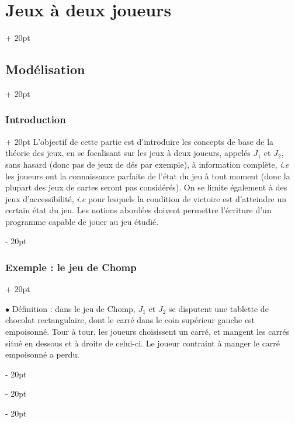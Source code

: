 \documentclass[a4paper, 12pt, twoside]{article}
\newcommand{\ind}[1][20pt]{\advance\leftskip + #1}
\newcommand{\deind}[1][20pt]{\advance\leftskip - #1}
\newenvironment{indt}[2][20pt]{#2 \par \ind[#1]}{\par \deind} %
\begin{document}
    \vspace{12pt}
    
    \begin{indt}{\section{Jeux à deux joueurs}}
        \begin{indt}{\subsection{Modélisation}}
            \begin{indt}{\subsubsection{Introduction}}
                L'objectif de cette partie est d'introduire les concepts de base de la théorie des jeux, en se focalisant sur les jeux à deux joueurs, appelés $J_1$ et $J_2$, sans hasard (donc pas de jeux de dés par exemple), à information complète, \textit{i.e} les joueurs ont la connaissance parfaite de l'état du jeu à tout moment (donc la plupart des jeux de cartes seront pas considérés).
                On se limite également à des jeux d'accessibilité, \textit{i.e} pour lesquels la condition de victoire est d'atteindre un certain état du jeu.
                Les notions abordées doivent permettre l'écriture d'un programme capable de jouer au jeu étudié.
            \end{indt}

            \vspace{12pt}
            
            \begin{indt}{\subsubsection{Exemple : le jeu de Chomp}}
                \label{4.1.2}

                $\bullet$ Définition : dans le jeu de Chomp, $J_1$ et $J_2$ se disputent une tablette de chocolat rectangulaire, dont le carré dans le coin supérieur gauche est empoisonné.
                Tour à tour, les joueurs choisissent un carré, et mangent les carrés situé en dessous et à droite de celui-ci.
                Le joueur contraint à manger le carré empoisonné a perdu.

                \vspace{12pt}
                

\end{indt}
\end{indt}
\end{indt}
\end{document}
